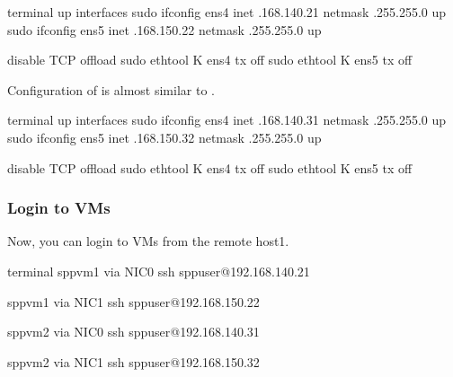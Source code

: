 \documentclass[a4paper,11pt,openany,oneside,english]{sphinxmanual}
\begin{document}
\begin{sphinxVerbatim}[commandchars=\\\{\},formatcom=\footnotesize]
 terminal 
 up interfaces
 sudo ifconfig ens4 inet .168.140.21 netmask .255.255.0 up
 sudo ifconfig ens5 inet .168.150.22 netmask .255.255.0 up

 disable TCP offload
 sudo ethtool \PYGZhy{}K ens4 tx off
 sudo ethtool \PYGZhy{}K ens5 tx off
\end{sphinxVerbatim}

Configuration of  is almost similar to .

\begin{sphinxVerbatim}[commandchars=\\\{\},formatcom=\footnotesize]
 terminal 
 up interfaces
 sudo ifconfig ens4 inet .168.140.31 netmask .255.255.0 up
 sudo ifconfig ens5 inet .168.150.32 netmask .255.255.0 up

 disable TCP offload
 sudo ethtool \PYGZhy{}K ens4 tx off
 sudo ethtool \PYGZhy{}K ens5 tx off
\end{sphinxVerbatim}


\subsubsection{Login to VMs}
\label{\detokenize{usecases/spp_vf:login-to-vms}}
Now, you can login to VMs from the remote host1.

\begin{sphinxVerbatim}[commandchars=\\\{\},formatcom=\footnotesize]
 terminal 
 spp\PYGZhy{}vm1 via NIC0
 ssh sppuser@192.168.140.21

 spp\PYGZhy{}vm1 via NIC1
 ssh sppuser@192.168.150.22

 spp\PYGZhy{}vm2 via NIC0
 ssh sppuser@192.168.140.31

 spp\PYGZhy{}vm2 via NIC1
 ssh sppuser@192.168.150.32
\end{sphinxVerbatim}
\end{document}
